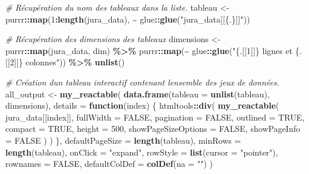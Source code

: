 \documentclass[
  french,
]{book}
\newenvironment{Shaded}{\begin{snugshade}}{\end{snugshade}}
\newcommand{\CommentTok}[1]{\textcolor[rgb]{0.56,0.35,0.01}{\textit{#1}}}
\newcommand{\ControlFlowTok}[1]{\textcolor[rgb]{0.13,0.29,0.53}{\textbf{#1}}}
\newcommand{\DataTypeTok}[1]{\textcolor[rgb]{0.13,0.29,0.53}{#1}}
\newcommand{\DecValTok}[1]{\textcolor[rgb]{0.00,0.00,0.81}{#1}}
\newcommand{\KeywordTok}[1]{\textcolor[rgb]{0.13,0.29,0.53}{\textbf{#1}}}
\newcommand{\NormalTok}[1]{#1}
\newcommand{\OperatorTok}[1]{\textcolor[rgb]{0.81,0.36,0.00}{\textbf{#1}}}
\newcommand{\OtherTok}[1]{\textcolor[rgb]{0.56,0.35,0.01}{#1}}
\newcommand{\StringTok}[1]{\textcolor[rgb]{0.31,0.60,0.02}{#1}}
\begin{document}
\begin{Shaded}
\begin{Highlighting}[]
\CommentTok{\# Récupération du nom des tableaux dans la liste.}
\NormalTok{tableau \textless{}{-}}\StringTok{ }\NormalTok{purrr}\OperatorTok{::}\KeywordTok{map}\NormalTok{(}\DecValTok{1}\OperatorTok{:}\KeywordTok{length}\NormalTok{(jura\_data), }\OperatorTok{\textasciitilde{}}\StringTok{ }\NormalTok{glue}\OperatorTok{::}\KeywordTok{glue}\NormalTok{(}\StringTok{"jura\_data[[\{.\}]]"}\NormalTok{))}

\CommentTok{\# Récupération des dimensions des tableaux}
\NormalTok{dimensions \textless{}{-}}\StringTok{ }\NormalTok{purrr}\OperatorTok{::}\KeywordTok{map}\NormalTok{(jura\_data, dim) }\OperatorTok{\%\textgreater{}\%}
\StringTok{  }\NormalTok{purrr}\OperatorTok{::}\KeywordTok{map}\NormalTok{(}\OperatorTok{\textasciitilde{}}\StringTok{ }\NormalTok{glue}\OperatorTok{::}\KeywordTok{glue}\NormalTok{(}\StringTok{"\{.[[1]]\} lignes et \{.[[2]]\} colonnes"}\NormalTok{)) }\OperatorTok{\%\textgreater{}\%}
\StringTok{  }\KeywordTok{unlist}\NormalTok{()}

\CommentTok{\# Création d\textquotesingle{}un tableau interactif contenant l\textquotesingle{}ensemble des jeux de données.}
\NormalTok{all\_output \textless{}{-}}\StringTok{ }\KeywordTok{my\_reactable}\NormalTok{(}
  \KeywordTok{data.frame}\NormalTok{(}\DataTypeTok{tableau =} \KeywordTok{unlist}\NormalTok{(tableau), dimensions),}
  \DataTypeTok{details =} \ControlFlowTok{function}\NormalTok{(index) \{}
\NormalTok{    htmltools}\OperatorTok{::}\KeywordTok{div}\NormalTok{(}
        \KeywordTok{my\_reactable}\NormalTok{(}
\NormalTok{          jura\_data[[index]],}
          \DataTypeTok{fullWidth =} \OtherTok{FALSE}\NormalTok{,}
          \DataTypeTok{pagination =} \OtherTok{FALSE}\NormalTok{,}
          \DataTypeTok{outlined =} \OtherTok{TRUE}\NormalTok{,}
          \DataTypeTok{compact =} \OtherTok{TRUE}\NormalTok{,}
          \DataTypeTok{height =} \DecValTok{500}\NormalTok{,}
          \DataTypeTok{showPageSizeOptions =} \OtherTok{FALSE}\NormalTok{,}
          \DataTypeTok{showPageInfo =} \OtherTok{FALSE}
\NormalTok{        )}
\NormalTok{    )}
\NormalTok{  \},}
  \DataTypeTok{defaultPageSize =} \KeywordTok{length}\NormalTok{(tableau), }
  \DataTypeTok{minRows =} \KeywordTok{length}\NormalTok{(tableau),}
  \DataTypeTok{onClick =} \StringTok{"expand"}\NormalTok{,}
  \DataTypeTok{rowStyle =} \KeywordTok{list}\NormalTok{(}\DataTypeTok{cursor =} \StringTok{"pointer"}\NormalTok{),}
  \DataTypeTok{rownames =} \OtherTok{FALSE}\NormalTok{,}
  \DataTypeTok{defaultColDef =} \KeywordTok{colDef}\NormalTok{(}\DataTypeTok{na =} \StringTok{""}\NormalTok{)}
\NormalTok{)}
\end{Highlighting}
\end{Shaded}
\end{document}
